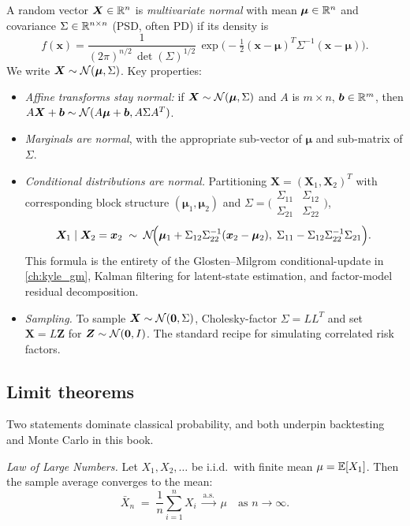 A random vector $\bm{X} \in \mathbb{R}^n$ is \emph{multivariate normal} with
mean $\bm{\mu} \in \mathbb{R}^n$ and covariance $\Sigma \in \mathbb{R}^{n\times n}$
(PSD, often PD) if its density is
\[
f(\bm{x}) = \frac{1}{(2\pi)^{n/2}\, \det(\Sigma)^{1/2}}\,
  \exp\!\Big(-\tfrac{1}{2}(\bm{x} - \bm{\mu})^T \Sigma^{-1}(\bm{x}-\bm{\mu})\Big).
\]
We write $\bm{X} \sim \mathcal{N}(\bm{\mu}, \Sigma)$. Key properties:
\begin{itemize}
  \item \emph{Affine transforms stay normal:} if
        $\bm{X} \sim \mathcal{N}(\bm{\mu}, \Sigma)$ and $A$ is $m\times n$,
        $\bm{b} \in \mathbb{R}^m$, then
        $A\bm{X} + \bm{b} \sim \mathcal{N}(A\bm{\mu} + \bm{b}, A\Sigma A^T)$.
  \item \emph{Marginals are normal}, with the appropriate sub-vector of
        $\bm{\mu}$ and sub-matrix of $\Sigma$.
  \item \emph{Conditional distributions are normal.} Partitioning
        $\bm{X} = (\bm{X}_1, \bm{X}_2)^T$ with corresponding block
        structure $(\bm{\mu}_1, \bm{\mu}_2)$ and
        $\Sigma = \bigl(\begin{smallmatrix}\Sigma_{11} & \Sigma_{12}\\
                         \Sigma_{21} & \Sigma_{22}\end{smallmatrix}\bigr)$,
        \[
        \bm{X}_1 \mid \bm{X}_2 = \bm{x}_2
        \;\sim\; \mathcal{N}\!\Big(\bm{\mu}_1 + \Sigma_{12}\Sigma_{22}^{-1}(\bm{x}_2 - \bm{\mu}_2),\;
          \Sigma_{11} - \Sigma_{12}\Sigma_{22}^{-1}\Sigma_{21}\Big).
        \]
        This formula is the entirety of the Glosten--Milgrom
        conditional-update in \cref{ch:kyle_gm}, Kalman filtering
        for latent-state estimation, and factor-model residual
        decomposition.
  \item \emph{Sampling.} To sample $\bm{X} \sim \mathcal{N}(\bm{0}, \Sigma)$,
        Cholesky-factor $\Sigma = LL^T$ and set $\bm{X} = L\bm{Z}$ for
        $\bm{Z} \sim \mathcal{N}(\bm{0}, I)$. The standard recipe for
        simulating correlated risk factors.
\end{itemize}

\subsection{Limit theorems}

Two statements dominate classical probability, and both underpin
backtesting and Monte Carlo in this book.

\emph{Law of Large Numbers.} Let $X_1, X_2, \dots$ be i.i.d.\ with finite
mean $\mu = \mathbb{E}[X_1]$. Then the sample average converges to the mean:
\[
\bar X_n \;=\; \frac{1}{n}\sum_{i=1}^n X_i \;\xrightarrow{\text{a.s.}}\; \mu
\quad \text{as } n \to \infty.
\]

